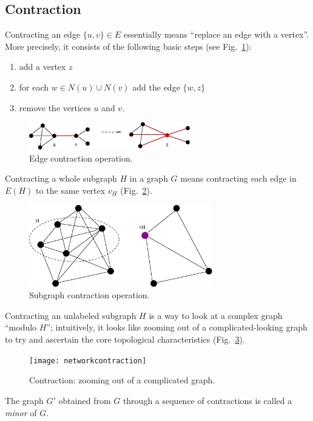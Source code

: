 \documentclass[a4paper]{book}
\theoremstyle{changebreak}                %
\begin{document}
\subsection{Contraction}
Contracting an edge
$\{u,v\}\in E$ essentially means ``replace an edge with a
vertex''. More precisely, it consists of the following basic steps
(see Fig.~\ref{f:edgecontract}):
\begin{enumerate}
\item add a vertex $z$
\item for each $w\in N(u)\cup N(v)$ add the edge $\{w,z\}$
\item remove the vertices $u$ and $v$.
\end{enumerate}
\begin{figure}[!ht]
\begin{center}
\includegraphics[width=7cm]{edgecontract}
\end{center}
\caption{Edge contraction operation.}
\label{f:edgecontract}
\end{figure}
Contracting a whole subgraph $H$ in a
graph $G$ means contracting each edge in $E(H)$ to the same vertex
$v_H$ (Fig.~\ref{f:subgraphcontract}).
\begin{figure}[!ht]
\begin{center}
\includegraphics[width=8cm]{contraction}
\end{center}
\caption{Subgraph contraction operation.}
\label{f:subgraphcontract}
\end{figure}
Contracting an unlabeled subgraph $H$ is a way to look at a complex
graph ``modulo $H$''; intuitively, it looks like zooming out of a
complicated-looking graph to try and ascertain the core topological
characteristics (Fig.~\ref{f:networkcontract}).
\begin{figure}[!ht]
\begin{center}
\texttt{[image: networkcontraction]}
\end{center}
\caption{Contraction: zooming out of a complicated graph.}
\label{f:networkcontract}
\end{figure}
The graph $G'$ obtained from $G$ through a sequence of contractions is
called a {\it minor} of $G$. 
\end{document}
